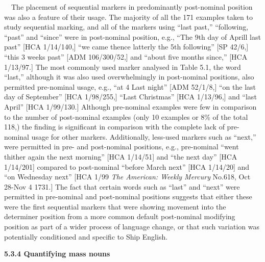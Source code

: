 \begin{styleStandard}
\ \ The placement of sequential markers in predominantly post-nominal position was also a feature of their usage. The majority of all the 171 examples taken to study sequential marking, and all of the markers using “last past,” “following, “past” and “since” were in post-nominal position, e.g., “The 9th day of Aprill last past” [HCA 1/14/140,] “we came thence latterly the 5th following” [SP 42/6,] “this 3 weeks past” [ADM 106/300/52,] and “about five months since,” [HCA 1/13/97.] The most commonly used marker analysed in Table 5.1, the word “last,” although it was also used overwhelmingly in post-nominal positions, also permitted pre-nominal usage, e.g., “at 4 Last night” [ADM 52/1/8,] “on the last day of September” [HCA 1/98/255,] “Last Christmas” [HCA 1/13/96,] and “last April” [HCA 1/99/130.] Although pre-nominal examples were few in comparison to the number of post-nominal examples (only 10 examples or 8\% of the total 118,) the finding is significant in comparison with the complete lack of pre-nominal usage for other markers. Additionally, less-used markers such as “next,” were permitted in pre- and post-nominal positions, e.g., pre-nominal “went thither again the next morning” [HCA 1/14/51] and “the next day” [HCA 1/14/201] compared to post-nominal “before March next” [HCA 1/14/20] and “on Wednesday next” [HCA 1/99 \textit{The American: Weekly Mercury} No.618, Oct 28-Nov 4 1731.] The fact that certain words such as “last” and “next” were permitted in pre-nominal and post-nominal positions suggests that either these were the first sequential markers that were showing movement into the determiner position from a more common default post-nominal modifying position as part of a wider process of language change, or that such variation was potentially conditioned and specific to Ship English. 
\end{styleStandard}


\begin{styleStandard}
\textbf{5.3.4 Quantifying mass nouns}
\end{styleStandard}


